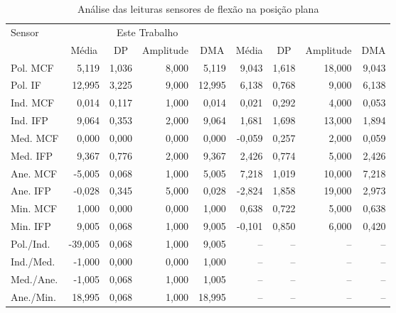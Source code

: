 \begin{table}[H]
  \centering
  \footnotesize
  \setlength{\abovecaptionskip}{0pt}
  \setlength{\belowcaptionskip}{0pt}
  \caption[Análise das leituras sensores de flexão na posição plana]{Análise das leituras sensores de flexão na posição plana}
  \label{tab:an_est_plan}
\begin{tabular}{l|rrrr|rrrr}
    \hline\hline
	\multirow{2}{*}{Sensor} & \multicolumn{4}{c|}{Este Trabalho} & \multicolumn{4}{c}{\citeonline{roversi}} \\
	\cline{2-9}
    \multirow{1}{*}{} & \multicolumn{1}{c}{Média}       & \multicolumn{1}{c}{\ac{DP}} & \multicolumn{1}{c}{Amplitude} & \multicolumn{1}{c|}{\ac{DMA}} & \multicolumn{1}{c}{Média}       & \multicolumn{1}{c}{\ac{DP}} & \multicolumn{1}{c}{Amplitude} & \multicolumn{1}{c}{\ac{DMA}} \\
    \hline
    Pol. MCF  & 5,119 & 1,036 & 8,000 & 5,119 & 9,043 & 1,618 & 18,000 & 9,043 \\
    Pol. IF  & 12,995 & 3,225 & 9,000 & 12,995 & 6,138 & 0,768 & 9,000 & 6,138 \\
    Ind. MCF  & 0,014 & 0,117 & 1,000 & 0,014 & 0,021 & 0,292 & 4,000 & 0,053 \\
    Ind. IFP  & 9,064 & 0,353 & 2,000 & 9,064 & 1,681 & 1,698 & 13,000 & 1,894 \\
    Med. MCF  & 0,000 & 0,000 & 0,000 & 0,000 & -0,059 & 0,257 & 2,000 & 0,059 \\
    Med. IFP  & 9,367 & 0,776 & 2,000 & 9,367 & 2,426 & 0,774 & 5,000 & 2,426 \\
    Ane. MCF  & -5,005 & 0,068 & 1,000 & 5,005 & 7,218 & 1,019 & 10,000 & 7,218 \\
    Ane. IFP  & -0,028 & 0,345 & 5,000 & 0,028 & -2,824 & 1,858 & 19,000 & 2,973 \\
    Min. MCF  & 1,000 & 0,000 & 0,000 & 1,000 & 0,638 & 0,722 & 5,000 & 0,638 \\
    Min. IFP  & 9,005 & 0,068 & 1,000 & 9,005 & -0,101 & 0,850 & 6,000 & 0,420 \\
    Pol./Ind. & -39,005 & 0,068 & 1,000 & 9,005 & -- & -- & -- & -- \\
    Ind./Med. & -1,000 & 0,000 & 0,000 & 1,000 & -- & -- & -- & -- \\
    Med./Ane. & -1,005 & 0,068 & 1,000 & 1,005 & -- & -- & -- & -- \\
    Ane./Min. & 18,995 & 0,068 & 1,000 & 18,995 & -- & -- & -- & -- \\
    \hline\hline
\end{tabular}
  \\\vspace{1.3mm}
\end{table}

